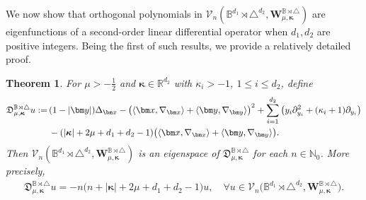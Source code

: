 \documentclass{amsart}
\newtheorem{thm}{Theorem}[section]
\theoremstyle{remark}
\def\la{{\langle}}
\def\ra{{\rangle}}
\def\fD{{\mathfrak D}}
\def\k{{\kappa}}
\def\la{{\langle}}
\def\ra{{\rangle}}
\def\CV{{\mathcal V}}
\def\BB{{\mathbb B}}
\def\NN{{\mathbb N}}
\def\RR{{\mathbb R}}
\def\bk{{\boldsymbol{\kappa}}}
\def\f{\frac}
\begin{document}
We now show that orthogonal polynomials in $\CV_n(\BB^{d_1}\! \rtimes \triangle^{d_2}, \bm W_{\mu, \bk}^{\BB\rtimes \triangle})$ 
are eigenfunctions of a second-order linear differential operator when $d_1, d_2$ are positive integers. Being the first of such
results, we provide a relatively detailed proof. 

\begin{thm}\label{thm:B-Tri}
For $\mu > -\f12$ and $\bk \in \RR^{d_2}$ with $\k_i > -1$, $1 \le i \le d_2$, define
\begin{align} \label{eq:diff_eqnBT}
  \fD_{\mu,\bk}^{\BB\rtimes \triangle} u : = \, &   (1-|\bm y|) \Delta_{\bm x} - \big(\la \bm x, \nabla_{\bm x} \ra + 
   \la \bm y, \nabla_{\bm y} \ra\big)^2  +  \sum_{i=1}^{d_2} \left( y_i \partial_{y_i}^2 + (\kappa_i +1) \partial_{y_i} \right) \\
    & - (|\bk| + 2\mu +d_1+d_2-1) \big(\la \bm x, \nabla_{\bm x} \ra +  \la \bm y, \nabla_{\bm y} \ra\big). \notag
\end{align}
Then $\CV_n(\BB^{d_1}\! \rtimes \triangle^{d_2}, \bm W_{\mu, \bk}^{\BB\rtimes \triangle})$ is an eigenspace of 
$\fD_{\mu,\bk}^{\BB\rtimes \triangle}$ for each $n \in \NN_0$. More precisely, 
\begin{align} \label{eq:eigenBT}
  \fD_{\mu,\bk}^{\BB\rtimes \triangle} u = - n \big( n+ | \bk| + 2 \mu + d_1 +d_2 -1 \big) u, \quad
      \forall u \in \CV_n\big(\BB^{d_1}\! \!\rtimes\!\triangle^{d_2}, \bm W_{\mu, \bk}^{\BB\rtimes \triangle}\big).
\end{align}
\end{thm}
\end{document}
